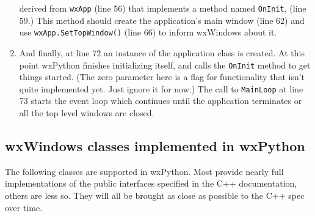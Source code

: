 \begin{enumerate}
derived from {\tt wxApp} (line 56) that implements a method named
{\tt OnInit}, (line 59.) This method should create the application's
main window (line 62) and use {\tt wxApp.SetTopWindow()} (line 66) to
inform wxWindows about it.
\item And finally, at line 72 an instance of the application class is
created. At this point wxPython finishes initializing itself, and calls
the {\tt OnInit} method to get things started. (The zero parameter here is
a flag for functionality that isn't quite implemented yet. Just
ignore it for now.)  The call to {\tt MainLoop} at line 73 starts the event
loop which continues until the application terminates or all the top
level windows are closed.
\end{enumerate}

\subsection{wxWindows classes implemented in wxPython}\label{wxpclasses}

The following classes are supported in wxPython. Most provide nearly
full implementations of the public interfaces specified in the C++
documentation, others are less so. They will all be brought as close
as possible to the C++ spec over time.

